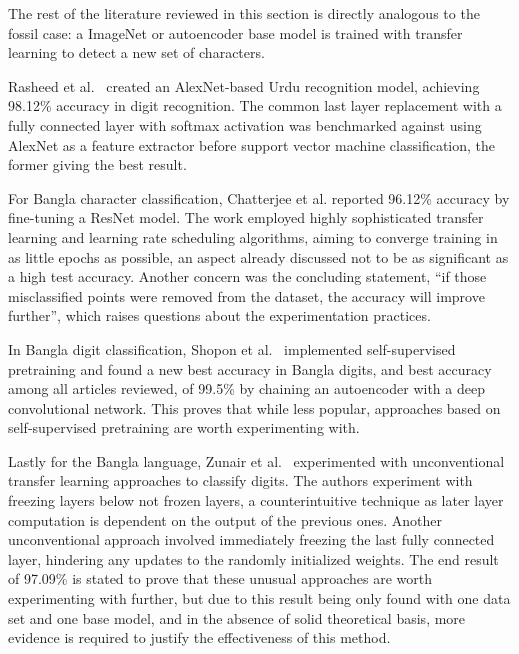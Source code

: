 \documentclass[english,twoside,openright]{UH_DS_MSc}
\begin{document}
The rest of the literature reviewed in this section is directly analogous 
to the fossil case: a ImageNet or autoencoder base model is trained with transfer learning to detect a new set of characters.

Rasheed et al.~\cite{5rasheedHandwrittenUrduWAlexNet} created an AlexNet-based Urdu recognition 
model, achieving 98.12\% accuracy in digit recognition. The common last layer replacement 
with a fully connected layer with softmax activation was benchmarked against using AlexNet as 
a feature extractor before support vector 
machine classification, the former giving the best result.

For Bangla character classification, Chatterjee et al. reported 96.12\% accuracy 
by fine-tuning a ResNet model. The work employed highly sophisticated transfer
 learning and learning rate scheduling algorithms, aiming to converge training in as 
 little epochs as possible, an aspect already discussed not to be as significant as a high test accuracy.
  Another concern was the concluding statement, ``if those misclassified points were 
  removed from the dataset, the accuracy will improve further'', which raises questions about the experimentation practices.

In Bangla digit classification, Shopon et al.~\cite{6shoponBangla} implemented self-supervised 
pretraining and found a new best accuracy in Bangla digits,
and best accuracy among all articles reviewed, of 99.5\% by chaining an autoencoder
with a deep convolutional network. This proves that while less popular, approaches based on self-supervised pretraining  are worth experimenting with.

Lastly for the Bangla language, Zunair et al.~\cite{11zunairUnconventionalWisdom} experimented 
with unconventional transfer learning approaches to classify digits.
The authors experiment with freezing layers below not frozen layers, a counterintuitive 
technique as later layer computation is dependent on the output of the previous ones.
Another unconventional approach involved immediately freezing the last fully connected layer, 
hindering any updates to the randomly initialized weights. The end result of 97.09\% is stated 
to prove that these unusual approaches are worth experimenting with further, but due to this 
result being only found with one data set and one base model, and in the absence of solid 
theoretical basis, more evidence is required to justify the effectiveness of this method.
\end{document}
